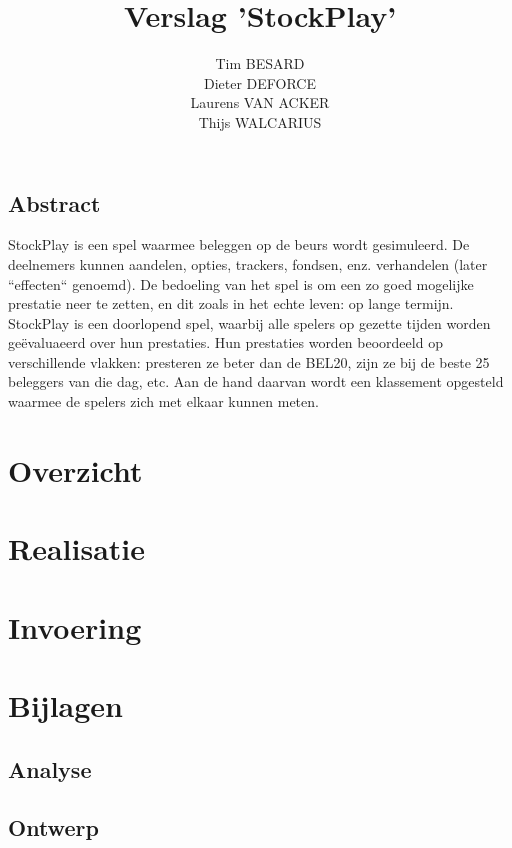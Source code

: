 \documentclass[a4paper,oneside,final]{memoir}
\title{Verslag 'StockPlay'}
\author{
Tim BESARD\\
Dieter DEFORCE\\
Laurens VAN ACKER\\
Thijs WALCARIUS
}
\begin{document}
\maketitle
{}
\tableofcontents
{}


%
%

\chapter*{Abstract}
StockPlay is een spel waarmee beleggen op de beurs wordt gesimuleerd. De deelnemers kunnen aandelen, opties, trackers, fondsen, enz. verhandelen (later ``effecten`` genoemd). De bedoeling van het spel is om een zo goed mogelijke prestatie neer te zetten, en dit zoals in het echte leven: op lange termijn. StockPlay is een doorlopend spel, waarbij alle spelers op gezette tijden worden ge\"evaluaeerd over hun prestaties. Hun prestaties worden beoordeeld op verschillende vlakken: presteren ze beter dan de BEL20, zijn ze bij de beste 25 beleggers van die dag, etc. Aan de hand daarvan wordt een klassement opgesteld waarmee de spelers zich met elkaar kunnen meten.

\part{Overzicht}
\label{pt:overzicht}


\part{Realisatie}
\label{pt:realisatie}


\part{Invoering}
\label{pt:invoering}


%
%

\part{Bijlagen}
\label{pt:bijlagen}
\appendix
\chapter{Analyse}
\label{pt:analyse}


\chapter{Ontwerp}
\label{chap:ontwerp}

\end{document}
